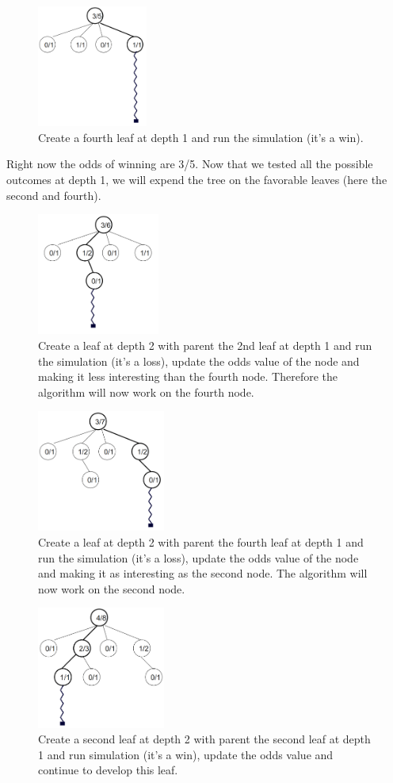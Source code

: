 \documentclass[12pt]{article}
\begin{document}
\begin{figure}[H]
\centering
\includegraphics[height=4cm]{img/5.png}
\caption{\label{fig:5}Create a fourth leaf at depth 1 and run the simulation (it's a win).}
\end{figure}
\noindent
Right now the odds of winning are 3/5. Now that we tested all the possible outcomes at depth 1, we will expend the tree on the favorable leaves (here the second and fourth).\\
\begin{figure}[H]
\centering
\includegraphics[height=4cm]{img/6.png}
\caption{\label{fig:6}Create a leaf at depth 2 with parent the 2nd leaf at depth 1 and run the simulation (it's a loss), update the odds value of the node and making it less interesting than the fourth node. Therefore the algorithm will now work on the fourth node.}
\end{figure}
\begin{figure}[H]
\centering
\includegraphics[height=4cm]{img/7.png}
\caption{\label{fig:7}Create a leaf at depth 2 with parent the fourth leaf at depth 1 and run the simulation (it's a loss), update the odds value of the node and making it as interesting as the second node. The algorithm will now work on the second node.}
\end{figure}
\begin{figure}[H]
\centering
\includegraphics[height=4cm]{img/8.png}
\caption{\label{fig:8}Create a second leaf at depth 2 with parent the second leaf at depth 1 and run simulation (it's a win), update the odds value and continue to develop this leaf.}
\end{figure}
\end{document}
